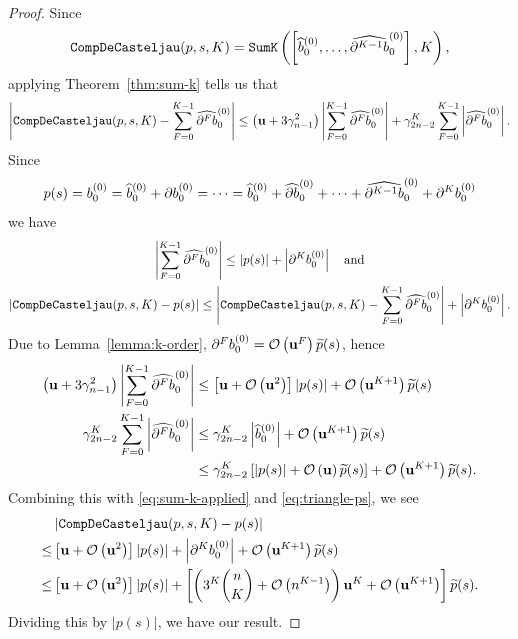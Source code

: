 \begin{proof}
Since
\begin{equation}
\mathtt{CompDeCasteljau}(p, s, K) = \mathtt{SumK}\left(\left[
  \widehat{b}_0^{(0)}, \ldots, \cdb{K - 1}_0^{(0)}\right], K\right),
\end{equation}
applying Theorem~\ref{thm:sum-k} tells us that
\begin{equation}\label{eq:sum-k-applied}
\left|\mathtt{CompDeCasteljau}(p, s, K) - \sum_{F = 0}^{K - 1}
\cdb{F}_0^{(0)}\right| \leq
\left(\mach + 3 \gamma_{n - 1}^2\right) \left|\sum_{F = 0}^{K - 1}
\cdb{F}_0^{(0)}\right| +
\gamma_{2n - 2}^K \sum_{F = 0}^{K - 1} \left|\cdb{F}_0^{(0)}\right|.
\end{equation}
Since
\begin{equation}
p(s) = b_0^{(0)} = \widehat{b}_0^{(0)} + \db{1}_0^{(0)}
= \cdots
= \widehat{b}_0^{(0)} + \cdb{1}_0^{(0)} + \cdots
+ \cdb{K - 1}_0^{(0)} + \db{K}_0^{(0)}
\end{equation}
we have
\begin{gather}
\left|\sum_{F = 0}^{K - 1} \cdb{F}_0^{(0)}\right|
\leq \left|p(s)\right| + \left|\db{K}_0^{(0)}\right| \quad \text{and} \\
\left|\mathtt{CompDeCasteljau}(p, s, K) - p(s)\right| \leq
\left|\mathtt{CompDeCasteljau}(p, s, K) - \sum_{F = 0}^{K - 1}
\cdb{F}_0^{(0)}\right| +
\left|\db{K}_0^{(0)}\right| \label{eq:triangle-ps}.
\end{gather}
Due to Lemma~\ref{lemma:k-order}, \(\db{F}_0^{(0)} =
\bigO{\mach^F} \widetilde{p}(s)\), hence
\begin{align}
\left(\mach + 3 \gamma_{n - 1}^2\right) \left|\sum_{F = 0}^{K - 1}
\cdb{F}_0^{(0)}\right| &\leq
\left[\mach + \bigO{\mach^2}\right] \left|p(s)\right| +
\bigO{\mach^{K + 1}} \widetilde{p}(s) \\
\gamma_{2n - 2}^K \sum_{F = 0}^{K - 1} \left|\cdb{F}_0^{(0)}\right| &\leq
\gamma_{2n - 2}^K \left|\widehat{b}_0^{(0)}\right| +
\bigO{\mach^{K + 1}} \widetilde{p}(s) \\
&\leq
\gamma_{2n - 2}^K \left[\left|p(s)\right| +
  \bigO{\mach} \widetilde{p}(s)\right] +
\bigO{\mach^{K + 1}} \widetilde{p}(s).
\end{align}
Combining this with \eqref{eq:sum-k-applied} and \eqref{eq:triangle-ps}, we
see
\begin{align}
& \left|\mathtt{CompDeCasteljau}(p, s, K) - p(s)\right| \\
\leq &
\left[\mach + \bigO{\mach^2}\right] \left|p(s)\right| +
\left|\db{K}_0^{(0)}\right| +
\bigO{\mach^{K + 1}} \widetilde{p}(s) \\
\leq &
\left[\mach + \bigO{\mach^2}\right] \left|p(s)\right| +
\left[\left(3^{K} \binom{n}{K} + \bigO{n^{K - 1}}\right) \mach^K +
\bigO{\mach^{K + 1}} \right]
\widetilde{p}(s).
\end{align}
Dividing this by \(\left|p(s)\right|\), we have our result.
\end{proof}

